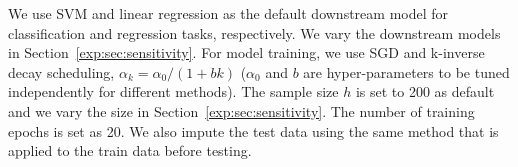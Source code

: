 We use SVM and linear regression as the default downstream model for classification and regression tasks, respectively. We vary the downstream models in Section~\ref{exp:sec:sensitivity}. For model training, we use SGD and k-inverse decay  scheduling, \ie $\alpha_k = \alpha_0 / (1+bk)$ ($\alpha_0$ and $b$ are hyper-parameters to be tuned independently for different methods).  The sample size $h$ is set to 200 as default and we vary the  size in Section~\ref{exp:sec:sensitivity}. The number of training epochs is set as 20. %
We also impute the test data using the same method that is applied to the train data before testing.
